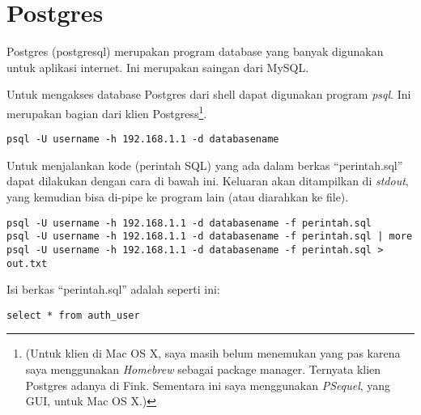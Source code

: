 \chapter{Postgres}
Postgres (postgresql) merupakan program database yang banyak digunakan
untuk aplikasi internet. Ini merupakan saingan dari MySQL.

Untuk mengakses database Postgres dari shell dapat digunakan
program {\em psql}. Ini merupakan bagian dari klien Postgress\footnote{
(Untuk klien di Mac OS X, saya masih belum menemukan yang pas
karena saya menggunakan {\em Homebrew} sebagai
package manager. Ternyata klien Postgres adanya di Fink.
Sementara ini saya menggunakan {\em PSequel}, yang GUI,
untuk Mac OS X.)
}.

\begin{lstlisting}
psql -U username -h 192.168.1.1 -d databasename 
\end{lstlisting}

Untuk menjalankan kode (perintah SQL) yang ada dalam berkas
``perintah.sql'' dapat dilakukan dengan cara di bawah ini.
Keluaran akan ditampilkan di {\em stdout}, yang kemudian bisa
di-pipe ke program lain (atau diarahkan ke file).

\begin{lstlisting}
psql -U username -h 192.168.1.1 -d databasename -f perintah.sql
psql -U username -h 192.168.1.1 -d databasename -f perintah.sql | more
psql -U username -h 192.168.1.1 -d databasename -f perintah.sql > out.txt
\end{lstlisting}

Isi berkas ``perintah.sql'' adalah seperti ini:

\begin{lstlisting}
select * from auth_user
\end{lstlisting}

